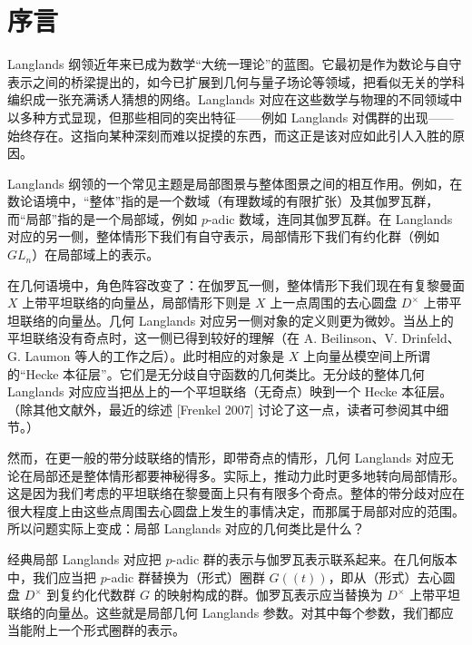 \chapter*{序言}

Langlands 纲领近年来已成为数学“大统一理论”的蓝图。它最初是作为数论与自守表示之间的桥梁提出的，如今已扩展到几何与量子场论等领域，把看似无关的学科编织成一张充满诱人猜想的网络。Langlands 对应在这些数学与物理的不同领域中以多种方式显现，但那些相同的突出特征——例如 Langlands 对偶群的出现——始终存在。这指向某种深刻而难以捉摸的东西，而这正是该对应如此引人入胜的原因。

Langlands 纲领的一个常见主题是局部图景与整体图景之间的相互作用。例如，在数论语境中，“整体”指的是一个数域（有理数域的有限扩张）及其伽罗瓦群，而“局部”指的是一个局部域，例如 $p$-adic 数域，连同其伽罗瓦群。在 Langlands 对应的另一侧，整体情形下我们有自守表示，局部情形下我们有约化群（例如 $GL_n$）在局部域上的表示。

在几何语境中，角色阵容改变了：在伽罗瓦一侧，整体情形下我们现在有复黎曼面 $X$ 上带平坦联络的向量丛，局部情形下则是 $X$ 上一点周围的去心圆盘 $D^\times$ 上带平坦联络的向量丛。几何 Langlands 对应另一侧对象的定义则更为微妙。当丛上的平坦联络没有奇点时，这一侧已得到较好的理解（在 A. Beilinson、V. Drinfeld、G. Laumon 等人的工作之后）。此时相应的对象是 $X$ 上向量丛模空间上所谓的“Hecke 本征层”。它们是无分歧自守函数的几何类比。无分歧的整体几何 Langlands 对应应当把丛上的一个平坦联络（无奇点）映到一个 Hecke 本征层。（除其他文献外，最近的综述 [Frenkel 2007] 讨论了这一点，读者可参阅其中细节。）

然而，在更一般的带分歧联络的情形，即带奇点的情形，几何 Langlands 对应无论在局部还是整体情形都要神秘得多。实际上，推动力此时更多地转向局部情形。这是因为我们考虑的平坦联络在黎曼面上只有有限多个奇点。整体的带分歧对应在很大程度上由这些点周围去心圆盘上发生的事情决定，而那属于局部对应的范围。所以问题实际上变成：局部 Langlands 对应的几何类比是什么？

经典局部 Langlands 对应把 $p$-adic 群的表示与伽罗瓦表示联系起来。在几何版本中，我们应当把 $p$-adic 群替换为（形式）圈群 $G(\!(t)\!)$，即从（形式）去心圆盘 $D^\times$ 到复约化代数群 $G$ 的映射构成的群。伽罗瓦表示应当替换为 $D^\times$ 上带平坦联络的向量丛。这些就是局部几何 Langlands 参数。对其中每个参数，我们都应当能附上一个形式圈群的表示。

